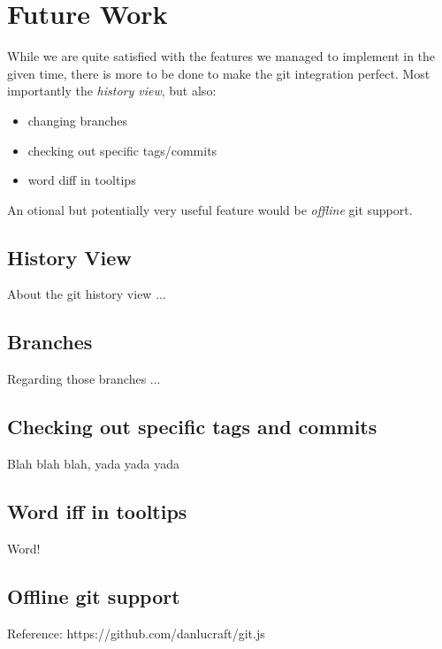\section{Future Work}
\label{sec:Future_Work}

While we are quite satisfied with the features we managed to implement in the given time,
there is more to be done to make the git integration perfect.
Most importantly the \emph{history view}, but also:
\begin{itemize}
	\item changing branches
	\item checking out specific tags/commits
	\item word diff in tooltips
\end{itemize}
An otional but potentially very useful feature would be \emph{offline} git support.

\subsection{History View}
\label{sec:history-view}

About the git history view ...

\subsection{Branches}
\label{sec:branches}

Regarding those branches ...

\subsection{Checking out specific tags and commits}
\label{sec:checkout}

Blah blah blah, yada yada yada

\subsection{Word iff in tooltips}
\label{sec:word-diff}

Word!

\subsection{Offline git support}
\label{sec:offline-git-support}

Reference: https://github.com/danlucraft/git.js
